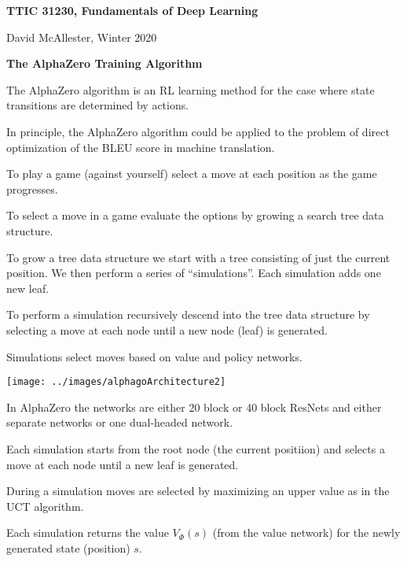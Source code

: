 




{\Huge

  \centerline{\bf TTIC 31230, Fundamentals of Deep Learning}
  \bigskip
  \centerline{David McAllester, Winter 2020}

  \vfill
  \centerline{\bf The AlphaZero Training Algorithm}
  \vfill
  \vfill


The AlphaZero algorithm is an RL learning method for the case where state transitions are determined by actions.

\vfill
In principle, the AlphaZero algorithm could be applied to the problem of direct optimization of the BLEU score in machine translation.


To play a game (against yourself) select a move at each position as the game progresses.

\vfill
To select a move in a game evaluate the options by growing a search tree data structure.

\vfill
To grow a tree data structure we start with a tree consisting of just the current position.
We then perform a series of ``simulations''. Each simulation adds one new leaf.

\vfill
To perform a simulation recursively descend into the tree data structure by selecting a move at each node until a new node (leaf) is generated.


Simulations select moves based on value and policy networks.

\centerline{\texttt{[image: ../images/alphagoArchitecture2]}}

\vfill
In AlphaZero the networks are either 20 block or 40 block ResNets and either separate networks or one dual-headed network.


Each simulation starts from the root node (the current positiion) and selects a move at each node until a new leaf is generated.

\vfill
During a simulation moves are selected by maximizing an upper value as in the UCT algorithm.

\vfill
Each simulation returns the value $V_\Phi(s)$ (from the value network) for the newly generated state (position) $s$.

}
